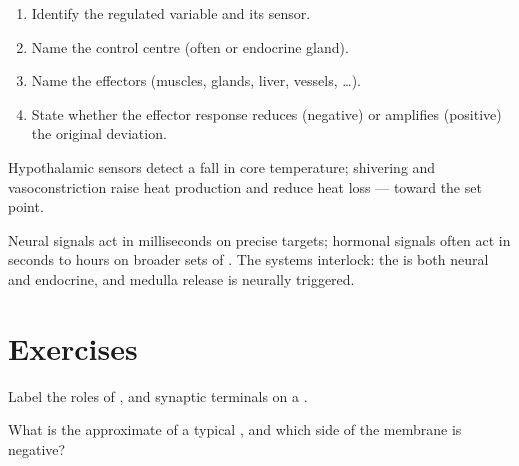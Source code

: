 \begin{method}
\label{met:g12:nerves-hormones:loop}
\begin{enumerate}
  \item Identify the regulated variable and its sensor.
  \item Name the control centre (often  or endocrine gland).
  \item Name the effectors (muscles, glands, liver, vessels, \ldots).
  \item State whether the effector response reduces (negative) or
        amplifies (positive) the original deviation.
\end{enumerate}
\end{method}

\begin{example}[Thermoregulation]\label{ex:g12:nerves-hormones:thermo}
Hypothalamic sensors detect a fall in core temperature; shivering and
vasoconstriction raise heat production and reduce heat loss ---  toward the set point.
\end{example}

\begin{proposition}
\label{prop:g12:nerves-hormones:timing}
Neural signals act in milliseconds on precise targets; hormonal signals
often act in seconds to hours on broader sets of . The systems
interlock: the  is both neural and endocrine, and 
medulla release is neurally triggered.
\end{proposition}
\admitted

\section{Exercises}

\begin{exercise}[$\star$]\label{exo:g12:nerves-hormones:1}
Label the roles of ,  and synaptic terminals on a .
\end{exercise}

\begin{exercise}[$\star$]\label{exo:g12:nerves-hormones:2}
What is the approximate  of a typical , and which
side of the membrane is negative?
\end{exercise}

